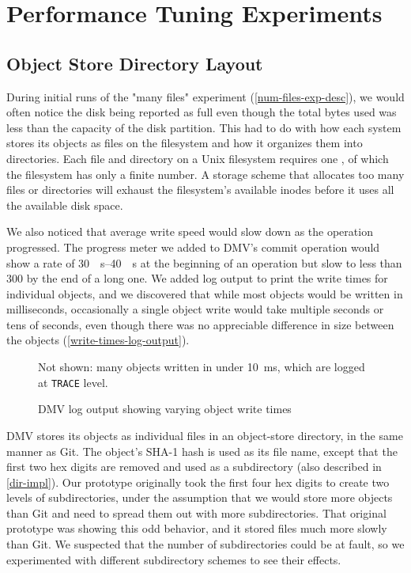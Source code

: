 \chapter{Performance Tuning Experiments}

\section{Object Store Directory Layout}
\label{dir-experiment}

During initial runs of the "many files" experiment
(\autoref{num-files-exp-desc}), we would often notice the disk being reported as
full even though the total bytes used was less than the capacity of the disk
partition. This had to do with how each system stores its objects as files on
the filesystem and how it organizes them into directories. Each file and
directory on a Unix filesystem requires one , of which the
filesystem has only a finite number. A storage scheme that allocates too many
files or directories will exhaust the filesystem's available inodes before it
uses all the available disk space.

We also noticed that average write speed would slow down as the operation
progressed. The progress meter we added to \gls{DMV}'s \gls{commit} operation
would show a rate of \SIrange{30}{40}{\mib\s} at the beginning of an operation
but slow to less than \SI{300}{\kib} by the end of a long one. We added log
output to print the write times for individual objects, and we discovered that
while most objects would be written in milliseconds, occasionally a single
object write would take multiple seconds or tens of seconds, even though there
was no appreciable difference in size between the objects
(\autoref{write-times-log-output}).

\begin{figure}
    \caption{DMV log output showing varying object write times}
    \label{write-times-log-output}
    \centering

    Not shown: many objects written in under \SI{10}{\ms}, which are logged at
    \lstinline{TRACE} level.

    
\end{figure}

\gls{DMV} stores its objects as individual files in an object-store directory,
in the same manner as Git. The object's SHA-1 hash is used as its file name,
except that the first two hex digits are removed and used as a subdirectory
(also described in \autoref{dir-impl}). Our prototype originally took the first
four hex digits to create two levels of subdirectories, under the assumption
that we would store more objects than Git and need to spread them out with more
subdirectories. That original prototype was showing this odd behavior, and it
stored files much more slowly than Git. We suspected that the number of
subdirectories could be at fault, so we experimented with different subdirectory
schemes to see their effects.

